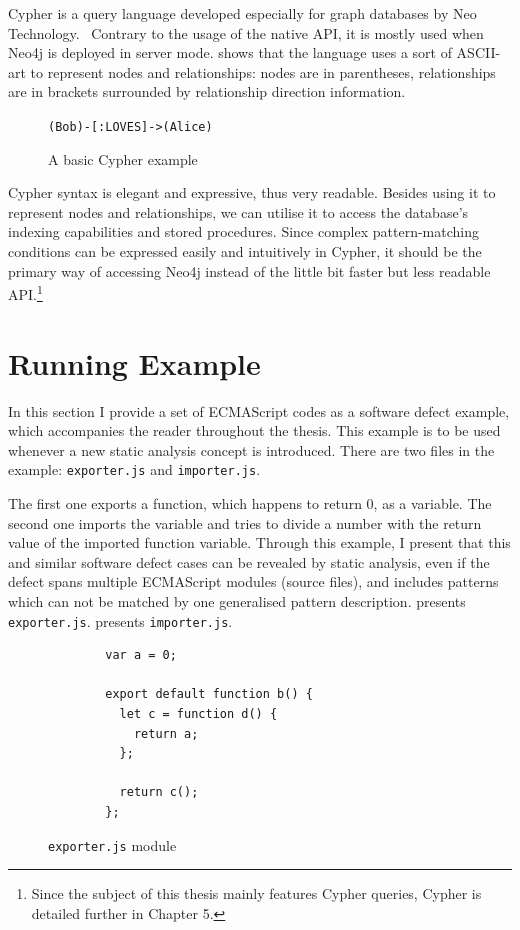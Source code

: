 Cypher is a query language developed especially for graph databases by Neo Technology.~\cite{neo4j-cypher} Contrary to the usage of the native API, it is mostly used when Neo4j is deployed in server mode.  shows that the language uses a sort of ASCII-art to represent nodes and relationships: nodes are in parentheses, relationships are in brackets surrounded by relationship direction information.

\begin{figure}[!htb]
	\centering
	\texttt{(Bob)-[:LOVES]->(Alice)}
  \caption{A basic Cypher example}
	\label{fig:cypher-intro}
\end{figure}

Cypher syntax is elegant and expressive, thus very readable. Besides using it to represent nodes and relationships, we can utilise it to access the database's indexing capabilities and stored procedures. Since complex pattern-matching conditions can be expressed easily and intuitively in Cypher, it should be the primary way of accessing Neo4j instead of the little bit faster but less readable API.\footnote{Since the subject of this thesis mainly features Cypher queries, Cypher is detailed further in Chapter 5.}


\section{Running Example}

In this section I provide a set of ECMAScript codes as a software defect example, which accompanies the reader throughout the thesis. This example is to be used whenever a new static analysis concept is introduced. There are two files in the example: \texttt{exporter.js} and \texttt{importer.js}.

The first one exports a function, which happens to return $0$, as a variable. The second one imports the variable and tries to divide a number with the return value of the imported function variable. Through this example, I present that this and similar software defect cases can be revealed by static analysis, even if the defect spans multiple ECMAScript modules (source files), and includes patterns which can not be matched by one generalised pattern description.  presents \texttt{exporter.js}.  presents \texttt{importer.js}.

\vspace{2em}
\begin{figure}[!htb]
	\centering
	\begin{minipage}{25em}
		\begin{verbatim}
		var a = 0;

		export default function b() {
		  let c = function d() {
		    return a;
		  };

		  return c();
		};
		\end{verbatim}
	\end{minipage}
  \caption{\texttt{exporter.js} module}
  \label{fig:running-example-exporter}
\end{figure}

